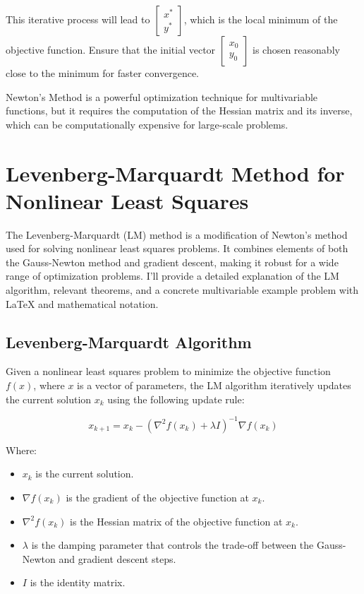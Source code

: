 \documentclass[a4paper]{article}
\begin{document}
This iterative process will lead to $\begin{bmatrix} x^* \\ y^* \end{bmatrix}$, which is the local minimum of the objective function. Ensure that the initial vector $\begin{bmatrix} x_0 \\ y_0 \end{bmatrix}$ is chosen reasonably close to the minimum for faster convergence.

Newton's Method is a powerful optimization technique for multivariable functions, but it requires the computation of the Hessian matrix and its inverse, which can be computationally expensive for large-scale problems.

\section{Levenberg-Marquardt Method for Nonlinear Least Squares}

The Levenberg-Marquardt (LM) method is a modification of Newton's method used for solving nonlinear least squares problems. It combines elements of both the Gauss-Newton method and gradient descent, making it robust for a wide range of optimization problems. I'll provide a detailed explanation of the LM algorithm, relevant theorems, and a concrete multivariable example problem with LaTeX and mathematical notation.

\subsection{Levenberg-Marquardt Algorithm}

Given a nonlinear least squares problem to minimize the objective function $f(x)$, where $x$ is a vector of parameters, the LM algorithm iteratively updates the current solution $x_k$ using the following update rule:

\[
x_{k+1} = x_k - (\nabla^2 f(x_k) + \lambda I)^{-1} \nabla f(x_k)
\]

Where:
\begin{itemize}
  \item $x_k$ is the current solution.
  \item $\nabla f(x_k)$ is the gradient of the objective function at $x_k$.
  \item $\nabla^2 f(x_k)$ is the Hessian matrix of the objective function at $x_k$.
  \item $\lambda$ is the damping parameter that controls the trade-off between the Gauss-Newton and gradient descent steps.
  \item $I$ is the identity matrix.
\end{itemize}
\end{document}
